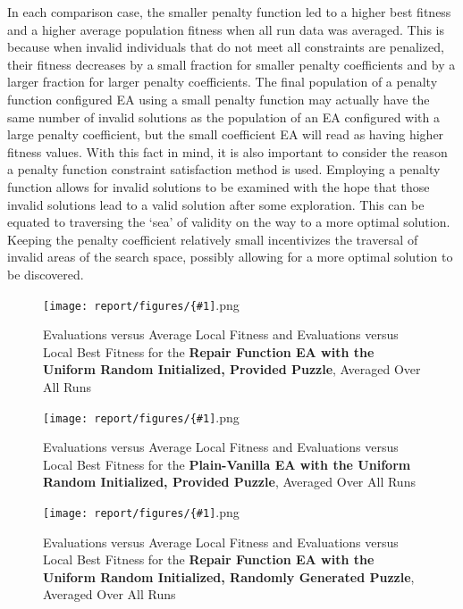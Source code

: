 \documentclass[11pt]{article}
\newcommand{\fitnessplotcaption}[1]{\caption{Evaluations versus Average Local Fitness and Evaluations versus 
    Local Best Fitness for the \textbf{{#1}}, Averaged Over All Runs}}
\newcommand{\addgraphic}[1]{\centerline{\texttt{[image: report/figures/\{\#1]}.png}}}
\begin{document}
In each comparison case, the smaller penalty function led to a higher best fitness and a higher average population fitness when
all run data was averaged. This is because when invalid individuals that do not meet all constraints are penalized, their fitness decreases
by a small fraction for smaller penalty coefficients and by a larger fraction for larger penalty coefficients. The final population of a
penalty function configured EA using a small penalty function may actually have the same number of invalid solutions as the population of an
EA configured with a large penalty coefficient, but the small coefficient EA will read as having higher fitness values. With this fact in mind,
it is also important to consider the reason a penalty function constraint satisfaction method is used. Employing a penalty function allows for
invalid solutions to be examined with the hope that those invalid solutions lead to a valid solution after some exploration. This can be 
equated to traversing the `sea' of validity on the way to a more optimal solution. Keeping the penalty coefficient relatively small incentivizes
the traversal of invalid areas of the search space, possibly allowing for a more optimal solution to be discovered.


\begin{figure}[H]
    \addgraphic{website_puzzle_uniform_random_bonus_graph}
    \fitnessplotcaption{Repair Function EA with the Uniform Random Initialized, Provided Puzzle}
    \label{fig:website_puzzle_uniform_random_bonus_graph}
\end{figure}

\begin{figure}[H]
    \addgraphic{website_puzzle_uniform_random_vanilla_graph}
    \fitnessplotcaption{Plain-Vanilla EA with the Uniform Random Initialized, Provided Puzzle}
    \label{fig:website_puzzle_uniform_random_vanilla_graph}
\end{figure}

\begin{figure}[H]
    \addgraphic{random_gen_uniform_random_bonus_graph}
    \fitnessplotcaption{Repair Function EA with the Uniform Random Initialized, Randomly Generated Puzzle}
    \label{fig:random_gen_uniform_random_bonus_graph}
\end{figure}
\end{document}
